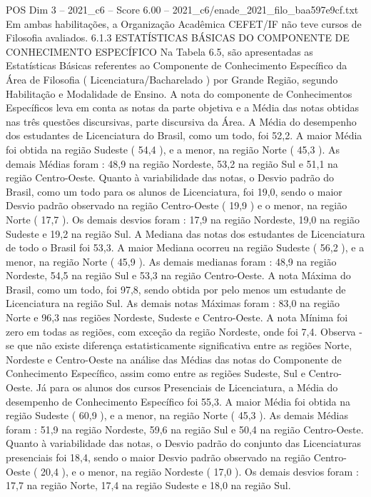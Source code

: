 \begin{textsample}{POS Dim 3 – 2021\_c6 – Score 6.00 – 2021\_c6/enade\_2021\_filo\_baa597e9cf.txt}
Em ambas habilitações, a Organização Acadêmica CEFET/IF não teve cursos de Filosofia avaliados. 6.1.3 ESTATÍSTICAS BÁSICAS DO COMPONENTE DE CONHECIMENTO ESPECÍFICO Na Tabela 6.5, são apresentadas as Estatísticas Básicas referentes ao Componente de Conhecimento Específico da Área de Filosofia ( Licenciatura/Bacharelado ) por Grande Região, segundo Habilitação e Modalidade de Ensino.
A nota do componente de Conhecimentos Específicos leva em conta as notas da parte objetiva e a Média das notas obtidas nas três questões discursivas, parte discursiva da Área.
A Média do desempenho dos estudantes de Licenciatura do Brasil, como um todo, foi 52,2.
A maior Média foi obtida na região Sudeste ( 54,4 ), e a menor, na região Norte ( 45,3 ).
As demais Médias foram : 48,9 na região Nordeste, 53,2 na região Sul e 51,1 na região Centro-Oeste.
Quanto à variabilidade das notas, o Desvio padrão do Brasil, como um todo para os alunos de Licenciatura, foi 19,0, sendo o maior Desvio padrão observado na região Centro-Oeste ( 19,9 ) e o menor, na região Norte ( 17,7 ).
Os demais desvios foram : 17,9 na região Nordeste, 19,0 na região Sudeste e 19,2 na região Sul.
A Mediana das notas dos estudantes de Licenciatura de todo o Brasil foi 53,3.
A maior Mediana ocorreu na região Sudeste ( 56,2 ), e a menor, na região Norte ( 45,9 ).
As demais medianas foram : 48,9 na região Nordeste, 54,5 na região Sul e 53,3 na região Centro-Oeste.
A nota Máxima do Brasil, como um todo, foi 97,8, sendo obtida por pelo menos um estudante de Licenciatura na região Sul.
As demais notas Máximas foram : 83,0 na região Norte e 96,3 nas regiões Nordeste, Sudeste e Centro-Oeste.
A nota Mínima foi zero em todas as regiões, com exceção da região Nordeste, onde foi 7,4.
Observa -se que não existe diferença estatisticamente significativa entre as regiões Norte, Nordeste e Centro-Oeste na análise das Médias das notas do Componente de Conhecimento Específico, assim como entre as regiões Sudeste, Sul e Centro-Oeste.
Já para os alunos dos cursos Presenciais de Licenciatura, a Média do desempenho de Conhecimento Específico foi 55,3.
A maior Média foi obtida na região Sudeste ( 60,9 ), e a menor, na região Norte ( 45,3 ).
As demais Médias foram : 51,9 na região Nordeste, 59,6 na região Sul e 50,4 na região Centro-Oeste.
Quanto à variabilidade das notas, o Desvio padrão do conjunto das Licenciaturas presenciais foi 18,4, sendo o maior Desvio padrão observado na região Centro-Oeste ( 20,4 ), e o menor, na região Nordeste ( 17,0 ).
Os demais desvios foram : 17,7 na região Norte, 17,4 na região Sudeste e 18,0 na região Sul.

\end{textsample}
